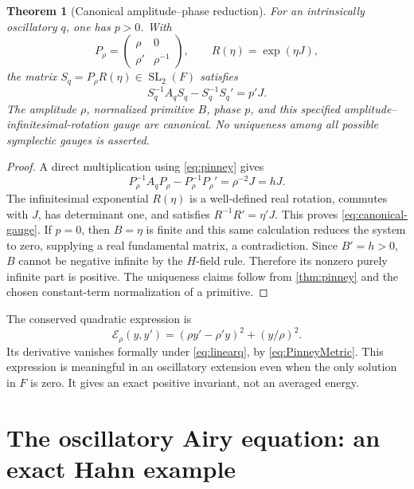 \documentclass[11pt,a4paper]{article}
\numberwithin{equation}{section}
\newtheorem{theorem}{Theorem}[section]
\theoremstyle{definition}
\theoremstyle{remark}
\newcommand{\SL}{\operatorname{SL}}
\begin{document}
\begin{theorem}[Canonical amplitude--phase reduction]\label{thm:canonicalpinney}
For an intrinsically oscillatory $q$, one has $p>0$. With
\[
 P_\rho=\begin{pmatrix}\rho&0\\\rho'&\rho^{-1}\end{pmatrix},
 \qquad R(\eta)=\exp(\eta J),
\]
the matrix $S_q=P_\rho R(\eta)\in\SL_2(F)$ satisfies
\begin{equation}\label{eq:canonical-gauge}
 S_q^{-1}A_qS_q-S_q^{-1}S_q'=p'J.
\end{equation}
The amplitude $\rho$, normalized primitive $B$, phase $p$, and this
specified amplitude--infinitesimal-rotation gauge are canonical. No
uniqueness among all possible symplectic gauges is asserted.
\end{theorem}
\begin{proof}
A direct multiplication using \eqref{eq:pinney} gives
\[
 P_\rho^{-1}A_qP_\rho-P_\rho^{-1}P_\rho'=\rho^{-2}J=hJ.
\]
The infinitesimal exponential $R(\eta)$ is a well-defined real rotation,
commutes with $J$, has determinant one, and satisfies
$R^{-1}R'=\eta'J$. This proves \eqref{eq:canonical-gauge}.
If $p=0$, then $B=\eta$ is finite and this same calculation reduces the
system to zero, supplying a real fundamental matrix, a contradiction.
Since $B'=h>0$, $B$ cannot be negative infinite by the $H$-field rule.
Therefore its nonzero purely infinite part is positive. The uniqueness
claims follow from \cref{thm:pinney} and the chosen constant-term
normalization of a primitive.
\end{proof}

The conserved quadratic expression is
\begin{equation}\label{eq:LewisInvariant}
 \mathcal E_\rho(y,y')=(\rho y'-\rho'y)^2+(y/\rho)^2.
\end{equation}
Its derivative vanishes formally under \eqref{eq:linearq}, by
\eqref{eq:PinneyMetric}. This expression is meaningful in an oscillatory
extension even when the only solution in $F$ is zero. It gives an exact
positive invariant, not an averaged energy.

\section{The oscillatory Airy equation: an exact Hahn example}\label{sec:airy}
\end{document}
